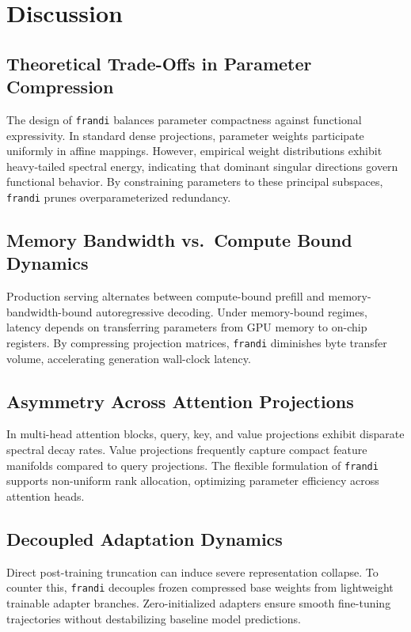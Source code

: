 \section{Discussion}

\subsection{Theoretical Trade-Offs in Parameter Compression}
The design of \texttt{frandi} balances parameter compactness against functional expressivity. In standard dense projections, parameter weights participate uniformly in affine mappings. However, empirical weight distributions exhibit heavy-tailed spectral energy, indicating that dominant singular directions govern functional behavior. By constraining parameters to these principal subspaces, \texttt{frandi} prunes overparameterized redundancy.

\subsection{Memory Bandwidth vs.\ Compute Bound Dynamics}
Production serving alternates between compute-bound prefill and memory-bandwidth-bound autoregressive decoding. Under memory-bound regimes, latency depends on transferring parameters from GPU memory to on-chip registers. By compressing projection matrices, \texttt{frandi} diminishes byte transfer volume, accelerating generation wall-clock latency.

\subsection{Asymmetry Across Attention Projections}
In multi-head attention blocks, query, key, and value projections exhibit disparate spectral decay rates. Value projections frequently capture compact feature manifolds compared to query projections. The flexible formulation of \texttt{frandi} supports non-uniform rank allocation, optimizing parameter efficiency across attention heads.

\subsection{Decoupled Adaptation Dynamics}
Direct post-training truncation can induce severe representation collapse. To counter this, \texttt{frandi} decouples frozen compressed base weights from lightweight trainable adapter branches. Zero-initialized adapters ensure smooth fine-tuning trajectories without destabilizing baseline model predictions.

